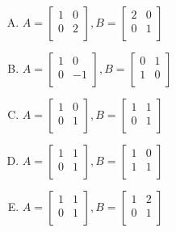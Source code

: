 \documentclass[10pt]{amsart}
\begin{document}
\begin{enumerate}
  \begin{enumerate}[(A)]
  \item $A = \left[\begin{matrix} 1 & 0 \\ 0 & 2 \\\end{matrix}\right], B = \left[\begin{matrix} 2 & 0 \\ 0 & 1 \\\end{matrix}\right]$
  \item $A = \left[\begin{matrix} 1 & 0 \\ 0 & -1 \\\end{matrix}\right], B = \left[\begin{matrix} 0 & 1 \\ 1 & 0 \\\end{matrix}\right]$
  \item $A = \left[\begin{matrix} 1 & 0 \\ 0 & 1 \\\end{matrix}\right], B = \left[\begin{matrix} 1 & 1 \\ 0 & 1 \\\end{matrix}\right]$
  \item $A = \left[\begin{matrix} 1 & 1 \\ 0 & 1 \\\end{matrix}\right], B = \left[\begin{matrix} 1 & 0 \\ 1 & 1 \\\end{matrix}\right]$
  \item $A = \left[\begin{matrix} 1 & 1 \\ 0 & 1 \\\end{matrix}\right], B = \left[\begin{matrix} 1 & 2 \\ 0 & 1 \\\end{matrix}\right]$
  \end{enumerate}


\end{enumerate}
\end{document}
